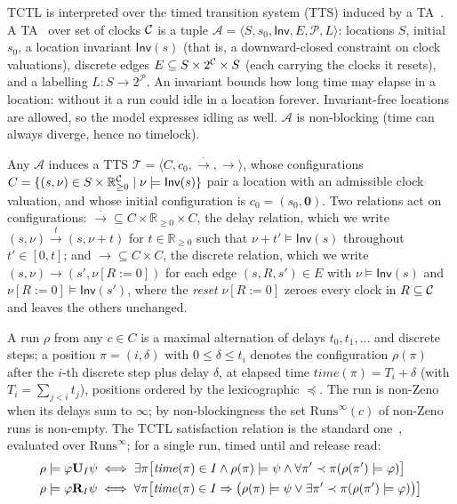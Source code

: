 TCTL is interpreted over the timed transition system (TTS) induced by a TA~\cite{AlurCourcoubetisDill1990,Baier08}. A TA~\cite{BehrmannLarsenYi2004Uppaal,Bouyer05TimedAutomata} over set of clocks $\mathcal{C}$ is a tuple $\mathcal{A}=\langle S,s_0,\mathsf{Inv},E,\mathcal{P},L\rangle$:
locations $S$, initial $s_0$, a {location invariant} $\mathsf{Inv}(s)$ (that is, a downward-closed constraint on clock valuations), discrete edges
$E\subseteq S\times 2^{\mathcal{C}}\times S$ (each carrying the clocks it resets), and a labelling
$L:S\to 2^{\mathcal{P}}$.  An
invariant bounds how long time may elapse in a location: without it a run could idle in a location forever. Invariant-free locations are allowed, so the model expresses idling as well. $\mathcal{A}$ is {non-blocking} (time can always
diverge, hence no timelock). 

Any $\mathcal{A}$ induces a TTS $\mathcal{T}=\langle C,c_0,\xrightarrow{\cdot},\to\rangle$, whose configurations $C=\{(s,\nu)\in S\times\mathbb{R}_{\ge 0}^{\mathcal{C}}\mid \nu\models\mathsf{Inv}(s)\}$ pair a location with an admissible clock valuation, and whose initial configuration is $c_0=(s_0,\mathbf{0})$. Two relations act on configurations: $\xrightarrow{\ \cdot\ } \subseteq C\times\mathbb{R}_{\ge0}\times C$, the delay relation, which we write $(s,\nu)\xrightarrow{t}(s,\nu+t)$ for $t\in\mathbb{R}_{\ge0}$ such that $\nu+t'\models\mathsf{Inv}(s)$ throughout $t'\in[0,t]$; and $\to\subseteq C\times C$, the discrete relation, which we write $(s,\nu)\to(s',\nu[R:=0])$ for each edge $(s,R,s')\in E$ with $\nu\models\mathsf{Inv}(s)$ and $\nu[R:=0]\models\mathsf{Inv}(s')$, where the \emph{reset} $\nu[R:=0]$ zeroes every clock in $R\subseteq \mathcal{C}$ and leaves the others unchanged. 



A {run} $\rho$ from any $c\in C$ is a maximal alternation of delays $t_0,t_1,\dots$ and discrete steps; a
{position} $\pi=(i,\delta)$ with $0\le\delta\le t_i$ denotes the configuration $\rho(\pi)$ after the $i$-th
discrete step plus delay $\delta$, at elapsed time $\mathit{time}(\pi)=T_i+\delta$ (with
$T_i=\sum_{j<i}t_j$), positions ordered by the lexicographic $\preceq$. The run is {non-Zeno} when its delays sum to $\infty$; by non-blockingness the set
$\mathrm{Runs}^\infty(c)$ of non-Zeno runs is non-empty. The TCTL satisfaction relation is the standard
one~\cite{AlurCourcoubetisDill1990}, evaluated over $\mathrm{Runs}^\infty$; for a single run, timed until and release read:
\vspace{-0.2cm}
\begin{align}
\rho&\models\varphi\mathbf{U}_I\psi \iff
\exists\pi\big[\mathit{time}(\pi)\in I \wedge \rho(\pi)\models\psi \wedge
\forall\pi'\prec\pi(\rho(\pi')\models\varphi)\big]
\label{eq:sat_u}\\
\rho&\models\varphi\mathbf{R}_I\psi \iff
\forall\pi\big[\mathit{time}(\pi)\in I \Rightarrow
\big(\rho(\pi)\models\psi \vee \exists\pi'\prec\pi(\rho(\pi')\models\varphi)\big)\big]
\label{eq:sat_r}
    \end{align}

